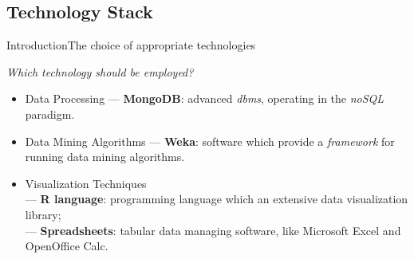 \subsection{Technology Stack}
\begin{frame}{Introduction}{The choice of appropriate technologies}

	\centering\textit{Which technology should be employed?} \vspace{0,3cm}

	\begin{block}{}
	    \begin{itemize}
		    \item<1-> \alert{Data Processing} --- \textbf{MongoDB}: advanced \emph{dbms}, operating in the \emph{noSQL} paradigm.
		    \item<2-> \alert{Data Mining Algorithms} --- \textbf{Weka}: software which provide a \emph{framework} for running data mining algorithms.
			\item<3-> \alert{Visualization Techniques} \\
			--- \textbf{R language}: programming language which an extensive data visualization library; \\
			--- \textbf{Spreadsheets}: tabular data managing software, like Microsoft Excel and OpenOffice Calc.
	    \end{itemize}
    \end{block}

\end{frame}
